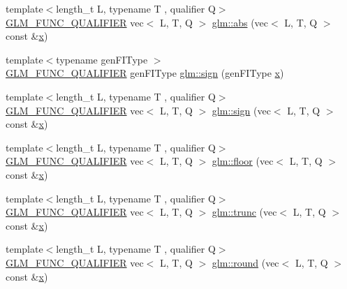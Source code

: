 \begin{DoxyCompactItemize}
\item 
{\footnotesize template$<$length\+\_\+t L, typename T , qualifier Q$>$ }\\\hyperlink{setup_8hpp_a33fdea6f91c5f834105f7415e2a64407}{G\+L\+M\+\_\+\+F\+U\+N\+C\+\_\+\+Q\+U\+A\+L\+I\+F\+I\+ER} vec$<$ L, T, Q $>$ \hyperlink{group__core__func__common_ga3e141c9738c73d3e581efa471dba8b4c}{glm\+::abs} (vec$<$ L, T, Q $>$ const \&\hyperlink{_s_d_l__opengl_8h_ad0e63d0edcdbd3d79554076bf309fd47}{x})
\item 
{\footnotesize template$<$typename gen\+F\+I\+Type $>$ }\\\hyperlink{setup_8hpp_a33fdea6f91c5f834105f7415e2a64407}{G\+L\+M\+\_\+\+F\+U\+N\+C\+\_\+\+Q\+U\+A\+L\+I\+F\+I\+ER} gen\+F\+I\+Type \hyperlink{namespaceglm_a4cb99d6c397185120f49d1d56cf45b84}{glm\+::sign} (gen\+F\+I\+Type \hyperlink{_s_d_l__opengl_8h_ad0e63d0edcdbd3d79554076bf309fd47}{x})
\item 
{\footnotesize template$<$length\+\_\+t L, typename T , qualifier Q$>$ }\\\hyperlink{setup_8hpp_a33fdea6f91c5f834105f7415e2a64407}{G\+L\+M\+\_\+\+F\+U\+N\+C\+\_\+\+Q\+U\+A\+L\+I\+F\+I\+ER} vec$<$ L, T, Q $>$ \hyperlink{group__core__func__common_ga1e2e5cfff800056540e32f6c9b604b28}{glm\+::sign} (vec$<$ L, T, Q $>$ const \&\hyperlink{_s_d_l__opengl_8h_ad0e63d0edcdbd3d79554076bf309fd47}{x})
\item 
{\footnotesize template$<$length\+\_\+t L, typename T , qualifier Q$>$ }\\\hyperlink{setup_8hpp_a33fdea6f91c5f834105f7415e2a64407}{G\+L\+M\+\_\+\+F\+U\+N\+C\+\_\+\+Q\+U\+A\+L\+I\+F\+I\+ER} vec$<$ L, T, Q $>$ \hyperlink{group__core__func__common_gaa9d0742639e85b29c7c5de11cfd6840d}{glm\+::floor} (vec$<$ L, T, Q $>$ const \&\hyperlink{_s_d_l__opengl_8h_ad0e63d0edcdbd3d79554076bf309fd47}{x})
\item 
{\footnotesize template$<$length\+\_\+t L, typename T , qualifier Q$>$ }\\\hyperlink{setup_8hpp_a33fdea6f91c5f834105f7415e2a64407}{G\+L\+M\+\_\+\+F\+U\+N\+C\+\_\+\+Q\+U\+A\+L\+I\+F\+I\+ER} vec$<$ L, T, Q $>$ \hyperlink{group__core__func__common_gaf9375e3e06173271d49e6ffa3a334259}{glm\+::trunc} (vec$<$ L, T, Q $>$ const \&\hyperlink{_s_d_l__opengl_8h_ad0e63d0edcdbd3d79554076bf309fd47}{x})
\item 
{\footnotesize template$<$length\+\_\+t L, typename T , qualifier Q$>$ }\\\hyperlink{setup_8hpp_a33fdea6f91c5f834105f7415e2a64407}{G\+L\+M\+\_\+\+F\+U\+N\+C\+\_\+\+Q\+U\+A\+L\+I\+F\+I\+ER} vec$<$ L, T, Q $>$ \hyperlink{group__core__func__common_gafa03aca8c4713e1cc892aa92ca135a7e}{glm\+::round} (vec$<$ L, T, Q $>$ const \&\hyperlink{_s_d_l__opengl_8h_ad0e63d0edcdbd3d79554076bf309fd47}{x})

\end{DoxyCompactItemize}
